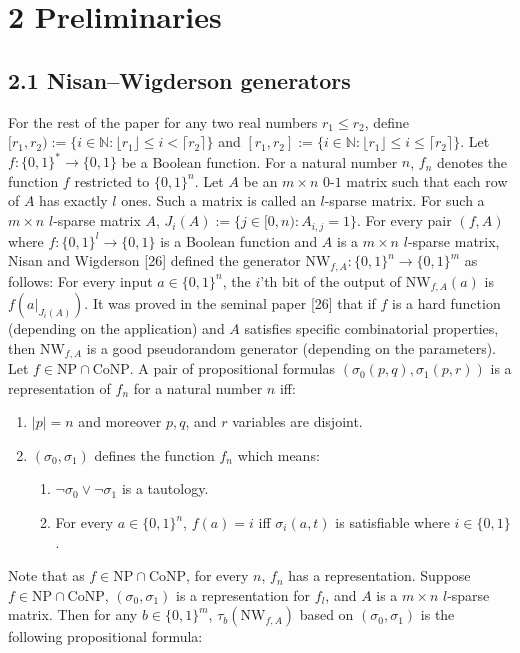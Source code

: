 \section*{2 Preliminaries}
\subsection*{2.1 Nisan–Wigderson generators}
For the rest of the paper for any two real numbers $r_1\leq r_2$, define $[r_1,r_2):=\{i\in\mathbb N:\lfloor r_1\rfloor\leq i<\lceil r_2\rceil\}$ and $[r_1,r_2]:=\{i\in\mathbb N:\lfloor r_1\rfloor\leq i\leq\lceil r_2\rceil\}$.
Let $f:\{0,1\}^*\to\{0,1\}$ be a Boolean function. For a natural number $n$, $f_n$ denotes the function $f$ restricted to $\{0,1\}^n$. Let $A$ be an $m\times n$ $0$-$1$ matrix such that each row of $A$ has exactly $l$ ones. Such a matrix is called an $l$-sparse matrix. For such a $m\times n$ $l$-sparse matrix $A$, $J_i(A):=\{j\in[0,n):A_{i,j}=1\}$.
For every pair $(f,A)$ where $f:\{0,1\}^l\to\{0,1\}$ is a Boolean function and $A$ is a $m\times n$ $l$-sparse matrix, Nisan and Wigderson [26] defined the generator $\mathrm{NW}_{f,A}:\{0,1\}^n\to\{0,1\}^m$ as follows:
For every input $a\in\{0,1\}^n$, the $i$'th bit of the output of $\mathrm{NW}_{f,A}(a)$ is $f(a|_{J_i(A)})$.
It was proved in the seminal paper [26] that if $f$ is a hard function (depending on the application) and $A$ satisfies specific combinatorial properties, then $\mathrm{NW}_{f,A}$ is a good pseudorandom generator (depending on the parameters).
Let $f\in\mathrm{NP}\cap\mathrm{CoNP}$. A pair of propositional formulas $(\sigma_0(p,q),\sigma_1(p,r))$ is a representation of $f_n$ for a natural number $n$ iff:
\begin{enumerate}
\item $|p|=n$ and moreover $p,q$, and $r$ variables are disjoint.
\item $(\sigma_0,\sigma_1)$ defines the function $f_n$ which means:
\begin{enumerate}
\item $\neg\sigma_0\vee\neg\sigma_1$ is a tautology.
\item For every $a\in\{0,1\}^n$, $f(a)=i$ iff $\sigma_i(a,t)$ is satisfiable where $i\in\{0,1\}$.
\end{enumerate}
\end{enumerate}
Note that as $f\in\mathrm{NP}\cap\mathrm{CoNP}$, for every $n$, $f_n$ has a representation.
Suppose $f\in\mathrm{NP}\cap\mathrm{CoNP}$, $(\sigma_0,\sigma_1)$ is a representation for $f_l$, and $A$ is a $m\times n$ $l$-sparse matrix. Then for any $b\in\{0,1\}^m$, $\tau_b(\mathrm{NW}_{f,A})$ based on $(\sigma_0,\sigma_1)$ is the following propositional formula:
